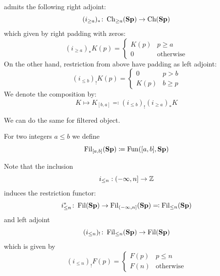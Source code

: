 admits the following right adjoint:
\begin{equation*}
    (i_{\geq a})_* \colon \operatorname{Ch}_{\geq a}(\mathbf{Sp}) \to \operatorname{Ch}(\mathbf{Sp})
\end{equation*}
which given by right padding with zeros:
\begin{equation}\label{eq:right_padding}
    (i_{\geq a})_* K(p) = \begin{cases}
        K(p) & p \geq a         \\
        0    & \text{otherwise}
    \end{cases}
\end{equation}
On the other hand, restriction from above have padding as left adjoint:
\begin{equation}\label{eq:res_from_above}
    (i_{\leq b})_! K(p) = \begin{cases}
        0    & p > b    \\
        K(p) & b \geq p
    \end{cases}
\end{equation}
We denote the composition by:
\begin{equation*}
    K \mapsto K_{[b,a]} \eqqcolon (i_{\leq b})_! (i_{\geq a})_* K
\end{equation*}

We can do the same for filtered object.
\begin{defn}
    For two integers $a \leq b$ we define
    \begin{equation*}
        \operatorname{Fil}_{[a,b]}(\mathbf{Sp}) \coloneqq \operatorname{Fun}([a,b],\mathbf{Sp})
    \end{equation*}
\end{defn}

Note that the inclusion
\begin{equation*}
    i_{\leq n}: (-\infty,n] \to \mathbb{Z}
\end{equation*}
induces the restriction functor:
\begin{equation*}
    i_{\leq n}^* \colon \operatorname{Fil}(\mathbf{Sp}) \to \operatorname{Fil}_{(-\infty,n]}(\mathbf{Sp}) \eqqcolon \operatorname{Fil}_{\leq n}(\mathbf{Sp})
\end{equation*}
and left adjoint
\begin{equation*}
    (i_{\leq n})_! \colon \operatorname{Fil}_{\leq n}(\mathbf{Sp}) \to \operatorname{Fil}(\mathbf{Sp})
\end{equation*}
which is given by
\begin{equation*}
    (i_{\leq n})_! F (p) = \begin{cases}
        F(p) & p \leq n         \\
        F(n) & \text{otherwise}
    \end{cases}
\end{equation*}

